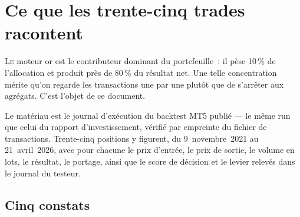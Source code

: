 \section{Ce que les trente-cinq trades racontent}

\lettrine{L}{e} moteur or est le contributeur dominant du portefeuille~: il pèse
10\,\% de l'allocation et produit près de 80\,\% du résultat net. Une telle
concentration mérite qu'on regarde les transactions une par une plutôt que de
s'arrêter aux agrégats. C'est l'objet de ce document.

Le matériau est le journal d'exécution du backtest MT5 publié --- le même run
que celui du rapport d'investissement, vérifié par empreinte du fichier de
transactions. Trente-cinq positions y figurent, du 9~novembre~2021 au
21~avril~2026, avec pour chacune le prix d'entrée, le prix de sortie, le volume
en lots, le résultat, le portage, ainsi que le score de décision et le levier
relevés dans le journal du testeur.

\subsection*{Cinq constats}

